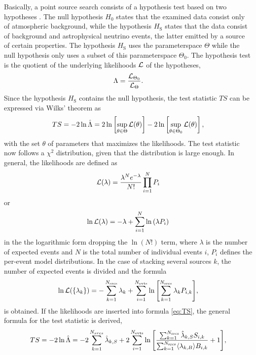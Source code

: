 Basically, a point source search consists of a hypothesis test based on two hypotheses \cite{likelihood_method}.
The null hypothesis $H_0$ states that the examined data consist only of atmospheric background, while the hypothesis $H_\text{S}$ states that the data consist of background and astrophysical neutrino events, the latter emitted by a source of certain properties.
The hypothesis $H_\text{S}$ uses the parameterspace $\Theta$ while the null hypothesis only uses a subset of this parameterspace $\Theta_0$.
The hypothesis test is the quotient of the underlying likelihoods $\mathcal{L}$ of the hypotheses,
\begin{equation}
  \Lambda = \frac{\mathcal{L}_{\Theta_0}}{\mathcal{L}_\Theta}.
\end{equation}
Since the hypothesis $H_\text{S}$ contains the null hypothesis, the test statistic $TS$ can be expressed via Wilks' theorem \cite{wilk} as
\begin{equation}
  TS = -2\ln\hat{\Lambda} = 2\ln\left[ \sup_{\theta\in\Theta}\mathcal{L}(\theta) \right] - 2\ln\left[ \sup_{\theta\in\Theta_0}\mathcal{L}(\theta) \right], \label{eq:TS}
\end{equation}
with the set $\theta$ of parameters that maximizes the likelihoods.
The test statistic now follows a $\chi^2$ distribution, given that the distribution is large enough.
In general, the likelihoods are defined as
\begin{equation}
  \mathcal{L}(\lambda) = \frac{\lambda^Ne^{-\lambda}}{N!}\prod^N_{i=1}P_i
\end{equation}
or
\begin{equation}
  \ln\mathcal{L}(\lambda) = -\lambda + \sum^N_{i=1}\ln{(\lambda P_i)}
\end{equation}
in the the logarithmic form \cite{ex_likelihood} dropping the $\ln(N!)$ term, where $\lambda$ is the number of expected events and $N$ is the total number of individual events $i$, $P_i$ defines the per-event model distributions.
In the case of stacking several sources $k$, the number of expected events is divided and the formula
\begin{equation}
  \ln\mathcal{L}(\{\lambda_k\}) = -\sum^{N_\text{srcs}}_{k=1}\lambda_k + \sum^{N_\text{evts}}_{i=1}\ln{\left[ \sum^{N_\text{srcs}}_{k=1}\lambda_k P_{i,k} \right]},
\end{equation}
is obtained.
If the likelihoods are inserted into formula \eqref{eq:TS}, the general formula for the test statistic is derived,
\begin{equation}
    TS = -2\ln{\hat\Lambda} = -2\sum_{k=1}^{N_{srcs}}\hat\lambda_{k,S} + 2\sum_{i=1}^{N_{\text{evts}}}\ln{\left[ \frac{\sum_{k=1}^{N_{\text{srcs}}}\hat\lambda_{k,S}S_{i,k}}{\sum_{k=1}^{N_{\text{srcs}}}\langle\lambda_{k,B}\rangle B_{i,k}}+1 \right]},
\end{equation}

